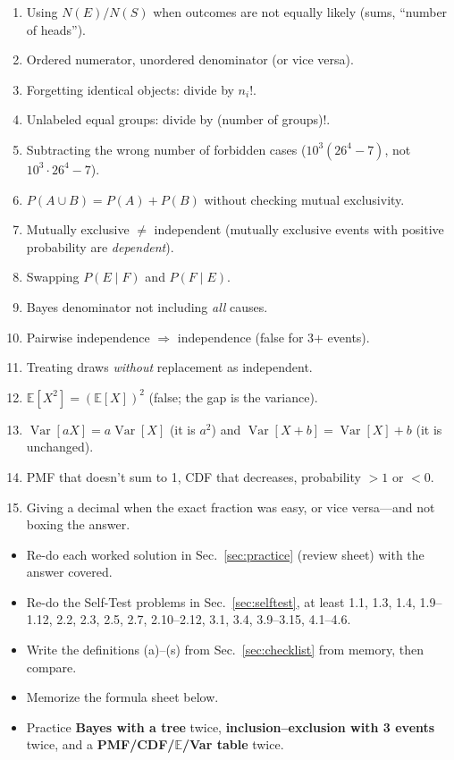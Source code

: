 \documentclass[11pt]{article}
\newcommand{\E}{\mathbb{E}}
\newcommand{\Var}{\operatorname{Var}}
\begin{document}
\begin{warnbox}
\begin{enumerate}
\item Using $N(E)/N(S)$ when outcomes are not equally likely (sums, ``number of heads'').
\item Ordered numerator, unordered denominator (or vice versa).
\item Forgetting identical objects: divide by $n_i!$.
\item Unlabeled equal groups: divide by (number of groups)!.
\item Subtracting the wrong number of forbidden cases ($10^3(26^4-7)$, not $10^3\cdot26^4-7$).
\item $P(A\cup B)=P(A)+P(B)$ without checking mutual exclusivity.
\item Mutually exclusive $\ne$ independent (mutually exclusive events with positive probability are \emph{dependent}).
\item Swapping $P(E\mid F)$ and $P(F\mid E)$.
\item Bayes denominator not including \emph{all} causes.
\item Pairwise independence $\Rightarrow$ independence (false for 3+ events).
\item Treating draws \emph{without} replacement as independent.
\item $\E[X^2]=(\E[X])^2$ (false; the gap is the variance).
\item $\Var[aX]=a\Var[X]$ (it is $a^2$) and $\Var[X+b]=\Var[X]+b$ (it is unchanged).
\item PMF that doesn't sum to 1, CDF that decreases, probability $>1$ or $<0$.
\item Giving a decimal when the exact fraction was easy, or vice versa---and not boxing the answer.
\end{enumerate}
\end{warnbox}

\begin{methodbox}
\begin{itemize}
\item Re-do each worked solution in Sec.~\ref{sec:practice} (review sheet) with the answer covered.
\item Re-do the Self-Test problems in Sec.~\ref{sec:selftest}, at least 1.1, 1.3, 1.4, 1.9--1.12, 2.2, 2.3, 2.5, 2.7, 2.10--2.12, 3.1, 3.4, 3.9--3.15, 4.1--4.6.
\item Write the definitions (a)--(s) from Sec.~\ref{sec:checklist} from memory, then compare.
\item Memorize the formula sheet below.
\item Practice \textbf{Bayes with a tree} twice, \textbf{inclusion--exclusion with 3 events} twice, and a \textbf{PMF/CDF/$\E$/Var table} twice.
\end{itemize}
\end{methodbox}
\end{document}
